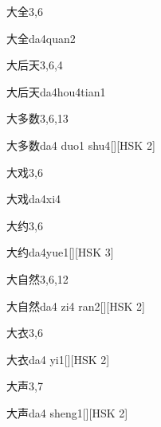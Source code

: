 \begin{entry}{大全}{3,6}
  \begin{phonetics}{大全}{da4quan2}
  \end{phonetics}
\end{entry}

\begin{entry}{大后天}{3,6,4}
  \begin{phonetics}{大后天}{da4hou4tian1}
  \end{phonetics}
\end{entry}

\begin{entry}{大多数}{3,6,13}
  \begin{phonetics}{大多数}{da4 duo1 shu4}[][HSK 2]
  \end{phonetics}
\end{entry}

\begin{entry}{大戏}{3,6}
  \begin{phonetics}{大戏}{da4xi4}
  \end{phonetics}
\end{entry}

\begin{entry}{大约}{3,6}
  \begin{phonetics}{大约}{da4yue1}[][HSK 3]
  \end{phonetics}
\end{entry}

\begin{entry}{大自然}{3,6,12}
  \begin{phonetics}{大自然}{da4 zi4 ran2}[][HSK 2]
  \end{phonetics}
\end{entry}

\begin{entry}{大衣}{3,6}
  \begin{phonetics}{大衣}{da4 yi1}[][HSK 2]
  \end{phonetics}
\end{entry}

\begin{entry}{大声}{3,7}
  \begin{phonetics}{大声}{da4 sheng1}[][HSK 2]
  \end{phonetics}
\end{entry}

